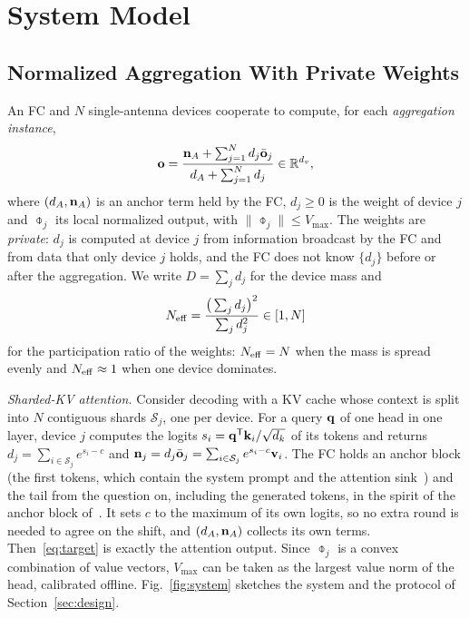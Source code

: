 \section{System Model}
\label{sec:model}

\subsection{Normalized Aggregation With Private Weights}

An FC and $N$ single-antenna devices cooperate to compute, for each \emph{aggregation instance},
\begin{equation}
\mathbf{o}=\frac{\mathbf{n}_A+\sum_{j=1}^N d_j\bar{\mathbf{o}}_j}{d_A+\sum_{j=1}^N d_j}\in\mathbb{R}^{d_v},
\label{eq:target}
\end{equation}
where $(d_A,\mathbf{n}_A)$ is an anchor term held by the FC, $d_j\ge0$ is the weight of device $j$ and $\obar_j$ its local normalized output, with $\|\obar_j\|\le V_{\max}$. The weights are \emph{private}: $d_j$ is computed at device $j$ from information broadcast by the FC and from data that only device $j$ holds, and the FC does not know $\{d_j\}$ before or after the aggregation. We write $D=\sum_j d_j$ for the device mass and
\begin{equation}
N_{\mathrm{eff}}=\frac{\big(\sum_j d_j\big)^2}{\sum_j d_j^2}\in[1,N]
\label{eq:neff}
\end{equation}
for the participation ratio of the weights: $N_{\mathrm{eff}}=N$ when the mass is spread evenly and $N_{\mathrm{eff}}\approx1$ when one device dominates.

\emph{Sharded-KV attention.} Consider decoding with a KV cache whose context is split into $N$ contiguous shards $\mathcal{S}_j$, one per device. For a query $\mathbf{q}$ of one head in one layer, device $j$ computes the logits $s_i=\mathbf{q}^{\mathsf T}\mathbf{k}_i/\sqrt{d_k}$ of its tokens and returns $d_j=\sum_{i\in\mathcal{S}_j}e^{s_i-c}$ and $\mathbf{n}_j=d_j\bar{\mathbf{o}}_j=\sum_{i\in\mathcal{S}_j}e^{s_i-c}\mathbf{v}_i$. The FC holds an anchor block (the first tokens, which contain the system prompt and the attention sink~\cite{xiao2024streaming}) and the tail from the question on, including the generated tokens, in the spirit of the anchor block of~\cite{acharya2025star}. It sets $c$ to the maximum of its own logits, so no extra round is needed to agree on the shift, and $(d_A,\mathbf{n}_A)$ collects its own terms. Then~\eqref{eq:target} is exactly the attention output. Since $\obar_j$ is a convex combination of value vectors, $V_{\max}$ can be taken as the largest value norm of the head, calibrated offline. Fig.~\ref{fig:system} sketches the system and the protocol of Section~\ref{sec:design}.

